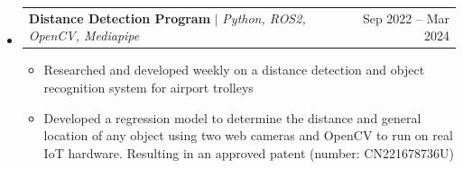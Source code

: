 \documentclass[letterpaper,11pt]{article}
\makeatletter
\newcommand{\resumeItem}[1]{
  \item\small{
    {#1 \vspace{-2pt}}
  }
}
\newcommand{\resumeProjectHeading}[2]{
    \item
    \begin{tabular*}{0.97\textwidth}{l@{\extracolsep{\fill}}r}
      \small#1 & #2 \\
    \end{tabular*}\vspace{-7pt}
}
\newcommand{\resumeSubHeadingListStart}{\begin{itemize}[leftmargin=0.15in, label={}]}
\newcommand{\resumeSubHeadingListEnd}{\end{itemize}}
\newcommand{\resumeItemListStart}{\begin{itemize}}
\newcommand{\resumeItemListEnd}{\end{itemize}\vspace{-5pt}}
\makeatother
\begin{document}
    \resumeSubHeadingListStart
      \resumeProjectHeading
					{\textbf{Distance Detection Program} $|$ \emph{Python, ROS2, OpenCV, Mediapipe}}{Sep 2022 -- Mar 2024}
          \resumeItemListStart
            \resumeItem{Researched and developed weekly on a distance detection and object recognition system for airport trolleys}
						\resumeItem{Developed a regression model to determine the distance and general location of any object using two web cameras and OpenCV to run on real IoT hardware. Resulting in an approved patent (number: CN221678736U)}

          \resumeItemListEnd
    \resumeSubHeadingListEnd
\end{document}
